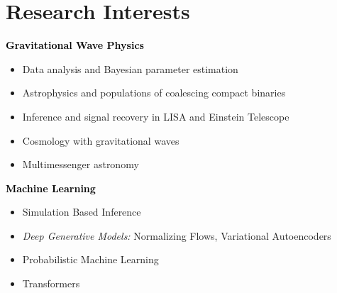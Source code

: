 \section{Research Interests}
\textbf{\textcolor{black}{Gravitational Wave Physics}}
\begin{itemize}[label=-, leftmargin=0.5cm]
    \item Data analysis and Bayesian parameter estimation
    \item Astrophysics and populations of coalescing compact binaries
    \item Inference and signal recovery in LISA and Einstein Telescope
    \item Cosmology with gravitational waves
    \item Multimessenger astronomy
\end{itemize}
\medskip
\textbf{\textcolor{black}{Machine Learning}}
\begin{itemize}[label=-, leftmargin=0.5cm]
    \item Simulation Based Inference
    \item \textit{Deep Generative Models:} Normalizing Flows, Variational Autoencoders
    \item Probabilistic Machine Learning
    \item Transformers
\end{itemize}

